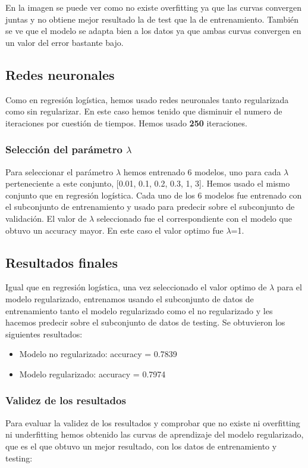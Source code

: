 \documentclass[11pt,spanish]{article}
\begin{document}
En la imagen se puede ver como no existe overfitting ya que las curvas convergen juntas y no obtiene mejor resultado la de test que la de entrenamiento. También se ve que el modelo se adapta bien a los datos ya que ambas curvas convergen en un valor del error bastante bajo.

\subsection{Redes neuronales}
Como en regresión logística, hemos usado redes neuronales tanto regularizada como sin regularizar. En este caso hemos tenido que disminuir el numero de iteraciones por cuestión de tiempos. Hemos usado \textbf{250} iteraciones.

\subsubsection{Selección del parámetro $\lambda$}
Para seleccionar el parámetro $\lambda$ hemos entrenado 6 modelos, uno para cada $\lambda$ perteneciente a este conjunto, [0.01, 0.1, 0.2, 0.3, 1, 3]. Hemos usado el mismo conjunto que en regresión logística. Cada uno de los 6 modelos fue entrenado con el subconjunto de entrenamiento y usado para predecir sobre el subconjunto de validación. El valor de $\lambda$ seleccionado fue el correspondiente con el modelo que obtuvo un accuracy mayor. En este caso el valor optimo fue $\lambda$=1.

\subsection{Resultados finales}
Igual que en regresión logística, una vez seleccionado el valor optimo de $\lambda$ para el modelo regularizado, entrenamos usando el subconjunto de datos de entrenamiento tanto el modelo regularizado como el no regularizado y les hacemos predecir sobre el subconjunto de datos de testing. Se obtuvieron los siguientes resultados:

\begin{itemize}
    \item Modelo no regularizado: accuracy = 0.7839
	\item Modelo regularizado: accuracy = 0.7974
\end{itemize}

\subsubsection{Validez de los resultados}
Para evaluar la validez de los resultados y comprobar que no existe ni overfitting ni underfitting hemos obtenido las curvas de aprendizaje del modelo regularizado, que es el que obtuvo un mejor resultado, con los datos de entrenamiento y testing:
\newline
\end{document}
